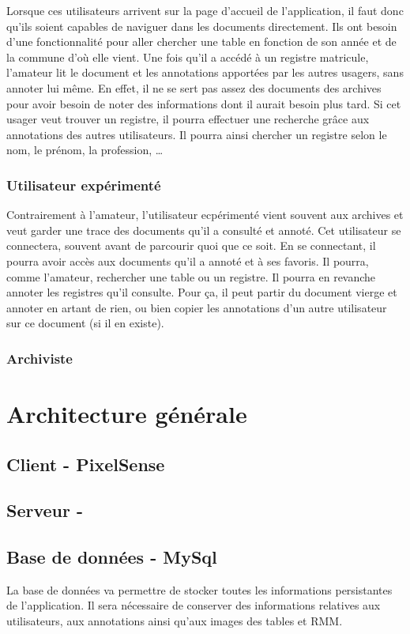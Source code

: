 \documentclass[a4paper]{article}
\begin{document}
Lorsque ces utilisateurs arrivent sur la page d'accueil de l'application, il faut donc qu'ils soient capables de naviguer dans les documents directement. Ils ont besoin d'une fonctionnalité pour aller chercher une table en fonction de son année et de la commune d'où elle vient. Une fois qu'il a accédé à un registre matricule, l'amateur lit le document et les annotations apportées par les autres usagers, sans annoter lui même. En effet, il ne se sert pas assez des documents des archives pour avoir besoin de noter des informations dont il aurait besoin plus tard. Si cet usager veut trouver un registre, il pourra effectuer une recherche grâce aux annotations des autres utilisateurs. Il pourra ainsi chercher un registre selon le nom, le prénom, la profession, \ldots

\subsubsection{Utilisateur expérimenté}
Contrairement à l'amateur, l'utilisateur ecpérimenté vient souvent aux archives et veut garder une trace des documents qu'il a consulté et annoté. Cet utilisateur se connectera, souvent avant de parcourir quoi que ce soit. En se connectant, il pourra avoir accès aux documents qu'il a annoté et à ses favoris. Il pourra, comme l'amateur, rechercher une table ou un registre. Il pourra en revanche annoter les registres qu'il consulte. Pour ça, il peut partir du document vierge et annoter en artant de rien, ou bien copier les annotations d'un autre utilisateur sur ce document (si il en existe).

\subsubsection{Archiviste}

\section{Architecture générale}
\subsection{Client - PixelSense}
\subsection{Serveur - }
\subsection{Base de données - MySql}
La base de donn\'ees va permettre de stocker toutes les informations persistantes de l'application. Il sera nécessaire de conserver des informations relatives aux utilisateurs, aux annotations ainsi qu'aux images des tables et RMM.
\end{document}
